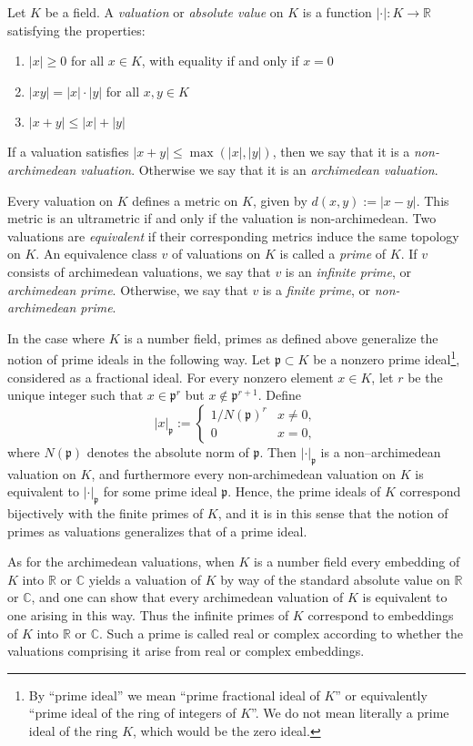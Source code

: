 \documentclass[12pt]{article}
\newcommand{\R}{\mathbb{R}}
\newcommand{\C}{\mathbb{C}}
\newcommand{\p}{\mathfrak{p}}
\begin{document}
Let $K$ be a field. A \emph{valuation} or \emph{absolute value} on $K$ is a function $|\cdot|\colon K \to \R$ satisfying the properties:
\begin{enumerate}
\item $|x| \geq 0$ for all $x \in K$, with equality if and only if $x=0$
\item $|xy| = |x|\cdot |y|$ for all $x,y \in K$
\item $|x+y| \leq |x| + |y|$
\end{enumerate}
If a valuation satisfies $|x+y| \leq \max(|x|, |y|)$, then we say that it is a \emph{non-archimedean valuation}. Otherwise we say that it is an \emph{archimedean valuation}.

Every valuation on $K$ defines a metric on $K$, given by $d(x,y) := |x-y|$. This metric is an ultrametric if and only if the valuation is non-archimedean. Two valuations are \emph{equivalent} if their corresponding metrics induce the same topology on $K$. An equivalence class $v$ of valuations on $K$ is called a \emph{prime} of $K$. If $v$ consists of archimedean valuations, we say that $v$ is an \emph{infinite prime}, or \emph{archimedean prime}. Otherwise, we say that $v$ is a \emph{finite prime}, or \emph{non-archimedean prime}.

In the case where $K$ is a number field, primes as defined above generalize the notion of prime ideals in the following way. Let $\p \subset K$ be a nonzero prime ideal\footnote{By ``prime ideal'' we mean ``prime fractional ideal of $K$'' or equivalently ``prime ideal of the ring of integers of $K$''. We do not mean literally a prime ideal of the ring $K$, which would be the zero ideal.}, considered as a fractional ideal. For every nonzero element $x \in K$, let $r$ be the unique integer such that $x \in \p^r$ but $x \notin \p^{r+1}$. Define
$$
|x|_\p :=
\begin{cases}
1/N(\p)^r & x \neq 0, \\
0 & x=0,
\end{cases}
$$
where $N(\p)$ denotes the absolute norm of $\p$. Then $|\cdot|_\p$ is a non--archimedean valuation on $K$, and furthermore every non-archimedean valuation on $K$ is equivalent to $|\cdot|_\p$ for some prime ideal $\p$. Hence, the prime ideals of $K$ correspond bijectively with the finite primes of $K$, and it is in this sense that the notion of primes as valuations generalizes that of a prime ideal.

As for the archimedean valuations, when $K$ is a number field every embedding of $K$ into $\R$ or $\C$ yields a valuation of $K$ by way of the standard absolute value on $\R$ or $\C$, and one can show that every archimedean valuation of $K$ is equivalent to one arising in this way. Thus the infinite primes of $K$ correspond to embeddings of $K$ into $\R$ or $\C$.  Such a prime is called real or complex according to whether the valuations comprising it arise from real or complex embeddings.
\end{document}
